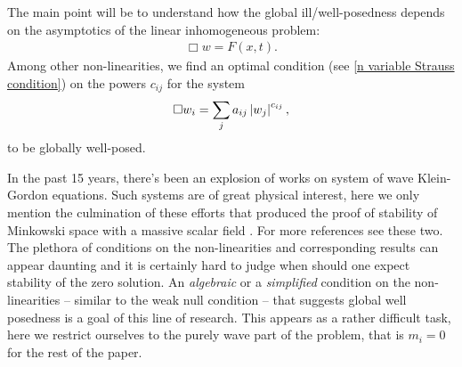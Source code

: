 \documentclass[11pt, oneside]{amsart}
\begin{document}
	The main point will be to understand how the global ill/well-posedness depends on the asymptotics of the linear inhomogeneous problem:
	\begin{equation}\label{linear equation}
		\begin{gathered}
			\Box w=F(x,t).
		\end{gathered}
	\end{equation}
	Among other non-linearities, we find an optimal condition (see \cref{n variable Strauss condition}) on the powers $c_{ij}$ for the system
	\begin{equation*}
		\begin{gathered}
			\Box w_i=\sum_j a_{ij}\left\lvert w_j\right\rvert^{c_{ij}},
		\end{gathered}
	\end{equation*}
	to be globally well-posed.
	
	In the past 15 years, there's been an explosion of works on system of wave Klein-Gordon equations. Such systems are of great physical interest, here we only mention the culmination of these efforts that produced the proof of stability of Minkowski space with a massive scalar field \cite{lefloch_global_2017} \cite{ionescu_einstein-klein-gordon_2022}. For more references see these two. The plethora of conditions on the non-linearities and corresponding results can appear daunting and it is certainly hard to judge when should one expect stability of the zero solution. An \textit{algebraic} or a \textit{simplified} condition on the non-linearities -- similar to the weak null condition -- that suggests global well posedness is a goal of this line of research. This appears as a rather difficult task, here we restrict ourselves to the purely wave part of the problem, that is $m_i=0$ for the rest of the paper.
	
\end{document}
